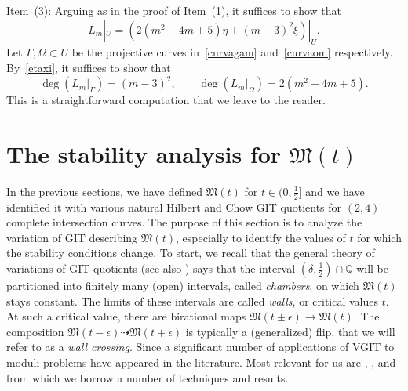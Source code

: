 \documentclass[11pt]{amsart}
\numberwithin{equation}{section}
\theoremstyle{plain}
\theoremstyle{remark}
\theoremstyle{definition}
\newcommand{\gM}{\mathfrak{M}}
\newcommand{\QQ}{{\mathbb Q}}
\begin{document}
Item~(3): Arguing as in the proof of Item~(1), it suffices to show that
%
\begin{equation}\label{hilbmu}
%
L_m|_U=(2(m^2-4m+5)\eta+(m-3)^2\xi)|_U.
%
\end{equation}
%
Let $\Gamma,\Omega\subset U$ be the projective curves in~\eqref{curvagam} and~\eqref{curvaom} respectively. By~\eqref{etaxi}, it suffices to show that
%
\begin{equation}
%
\deg(L_m|_{\Gamma})=(m-3)^2,\qquad \deg(L_m|_{\Omega})=2(m^2-4m+5).
%
\end{equation}
%
This is a straightforward computation that we leave to the reader.












\section{The stability analysis for $\gM(t)$}\label{sec:sec-VGIT}
In the previous sections, we have defined $\gM(t)$ for $t\in(0,\frac{1}{2}]$ and we have identified it with various natural Hilbert and Chow GIT quotients for $(2,4)$ complete intersection curves. The purpose of this section is to analyze the variation of GIT describing $\gM(t)$, especially to identify the values of $t$ for which the stability conditions change. To start, we recall that the general theory of  variations of GIT quotients \cite{thaddeus,dolgachevhu} (see also \cite{VGIT}) says that the interval $(\delta,\frac{1}{2})\cap\QQ$ will be partitioned into finitely many (open) intervals, called {\it chambers}, on which $\gM(t)$ stays constant. The limits of these intervals are called {\it walls}, or critical values $t$. At such a critical value, there are birational maps $\gM(t\pm \epsilon)\to \gM(t)$. The composition $\gM(t-\epsilon)\dashrightarrow \gM(t+\epsilon)$ is typically a (generalized) flip, that we will refer to as a {\it wall crossing}. Since \cite{thaddeus,dolgachevhu} a significant number of applications of VGIT to moduli problems have appeared in the literature. Most relevant for us are \cite{hh2}, \cite{g4git}, and \cite{benoist} from which we borrow a number of techniques and results. 
\end{document}
